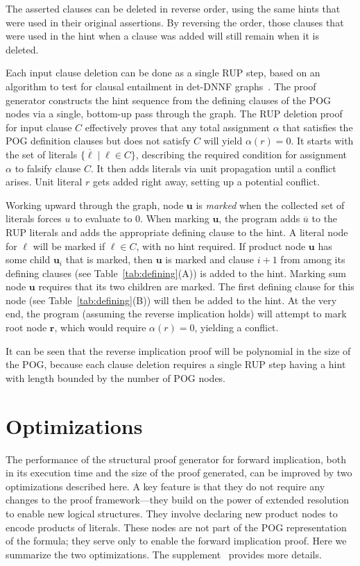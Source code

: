 \documentclass[letterpaper,USenglish,cleveref, autoref, thm-restate]{lipics-v2021}
\newcommand{\obar}[1]{\overline{#1}}
\newcommand{\lit}{\ell}
\newcommand{\assign}{\alpha}
\newcommand{\makenode}[1]{\mathbf{#1}}
\newcommand{\nodeu}{\makenode{u}}
\newcommand{\noder}{\makenode{r}}
\begin{document}
The asserted clauses can be deleted in reverse order, using the same
hints that were used in their original assertions.  By reversing the
order, those clauses that were used in the hint when a clause was
added will still remain when it is deleted.

Each input clause deletion can be done as a single RUP step, based
on an algorithm to test for clausal entailment in det-DNNF graphs~\cite{capelli:sat:2019,darwiche:jair:2002}.  The
proof generator constructs the hint sequence from the defining
clauses of the POG nodes via a single, bottom-up pass through the
graph.  The RUP deletion proof for input clause $C$ effectively proves that any
total assignment $\assign$ that satisfies the POG definition clauses
but does not satisfy $C$ will yield
$\assign(r) = 0$.  It starts with the set of literals
$\{ \obar{\lit} \mid \lit \in C\}$, describing the required condition for
assignment $\assign$ to falsify clause $C$.
It then
adds literals via unit propagation until a
conflict arises.    Unit literal $r$ gets
added right away, setting up a potential conflict.

Working upward through the graph, node $\nodeu$ is \emph{marked} when
the collected set of literals forces $u$ to evaluate to $0$.  When marking $\nodeu$, the
program adds $\obar{u}$ to the RUP literals and adds the appropriate
defining clause to the hint.  A literal node for
$\lit$ will be marked if $\lit \in C$, with no hint required.  If
product node $\nodeu$ has some child $\nodeu_i$ that is marked, then
$\nodeu$ is marked and clause $i+1$ from among its defining clauses (see Table~\ref{tab:defining}(A)) is
added to the hint.  Marking sum node $\nodeu$ requires that its two children are marked.
The first defining
clause for this node (see Table~\ref{tab:defining}(B)) will then be added to the hint.  At the very end, the program
(assuming the reverse implication holds) will attempt to mark root
node $\noder$, which would require $\assign(r) = 0$, yielding a
conflict.

It can be seen that the reverse implication proof will be polynomial in the size of the POG\@, because
each clause deletion requires a single RUP step having a hint with length
bounded by the number of POG nodes.  

\section{Optimizations}

The performance of the structural proof generator for forward implication, both in its execution time and
the size of the proof generated, can be improved by two optimizations
described here.  A key feature is that they do not require any changes
to the proof framework---they build on the power of extended
resolution to enable new logical structures.  They
involve declaring new product nodes to encode products of literals.
These nodes are not part of the POG
representation of the formula; they serve only to enable the forward
implication proof.  Here we summarize the two optimizations.
The supplement~\cite{bryant:sat:2023:supplement} provides more details.
\end{document}
